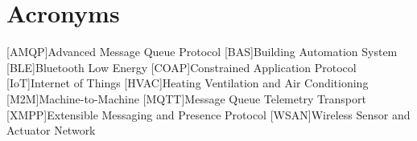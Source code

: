 \chapter{Acronyms}

\footnotesize
\SingleSpacing

\begin{multicols}{2}
\begin{acronym}[AAAAAA]

	[AMQP]{Advanced Message Queue Protocol}
	[BAS]{Building Automation System}
	[BLE]{Bluetooth Low Energy}
	[COAP]{Constrained Application Protocol}
	[IoT]{Internet of Things}
	[HVAC]{Heating Ventilation and Air Conditioning}
	[M2M]{Machine-to-Machine}
	[MQTT]{Message Queue Telemetry Transport}
	[XMPP]{Extensible Messaging and Presence Protocol}
	[WSAN]{Wireless Sensor and Actuator Network}
	


\end{acronym}
\end{multicols}

